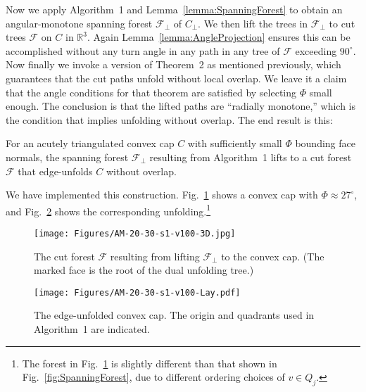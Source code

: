 \documentclass{cccg17}
\newcommand{\bluenew}[1]{{#1}}  %
\newcommand{\rednote}[1]{{}}  %
\newcommand{\figlab}[1]{\label{fig:#1}}
\newcommand{\lemref}[1]{\ref{lemma:#1}}
\newcommand{\figref}[1]{\ref{fig:#1}}
\def\F{{\mathcal F}}
\begin{document}
Now we apply Algorithm~1 and Lemma~\lemref{SpanningForest} to obtain an angular-monotone
spanning forest $\F_\bot$ of $C_\bot$.
We then lift the trees in $\F_\bot$ to cut trees $\F$ on $C$ in $\mathbb{R}^3$.
Again Lemma~\lemref{AngleProjection} ensures this can be accomplished without
any turn angle in any path in any tree of $\F$ exceeding $90^\circ$.
Now finally we invoke \bluenew{a version of} Theorem~2 as mentioned previously, which guarantees
that the cut paths unfold without local overlap.
We leave it a claim that the angle conditions for that theorem are satisfied 
by selecting $\Phi$ small enough.
The conclusion is that the lifted paths are ``radially monotone,'' which is the
condition that implies unfolding without overlap.
The end result is this:

\begin{conj}
For an acutely triangulated convex cap $C$ with sufficiently small $\Phi$ bounding face normals,
the spanning forest $\F_\bot$ resulting from Algorithm~1
lifts to a cut forest $\F$ that edge-unfolds $C$ without overlap.
\end{conj}

\medskip
\noindent
We have implemented this construction.
Fig.~\figref{AM-20-30-s1-v100-3D} shows a convex cap
with $\Phi \approx 27^\circ$, and Fig.~\figref{AM-20-30-s1-v100-Lay} shows
the corresponding unfolding.\footnote{
The forest in Fig.~\figref{AM-20-30-s1-v100-3D}
is slightly different than that shown in Fig.~\figref{SpanningForest},
due to different ordering choices of $v \in Q_j$.
}
\begin{figure}[htbp]
\centering
\texttt{[image: Figures/AM-20-30-s1-v100-3D.jpg]}
\caption{The cut forest $\F$ resulting from lifting $\F_\bot$ to the convex cap.
(The marked face is the root of the dual unfolding tree.)}
\figlab{AM-20-30-s1-v100-3D}
\end{figure}
\begin{figure}[htbp]
\centering
\texttt{[image: Figures/AM-20-30-s1-v100-Lay.pdf]}
\caption{The edge-unfolded convex cap. The origin and quadrants
used in Algorithm~1 are indicated.} %
\figlab{AM-20-30-s1-v100-Lay}
\end{figure}
\rednote{I may replace this figure eventually, to remove the root-face highlighting,
which is only distracting here.}
\end{document}
